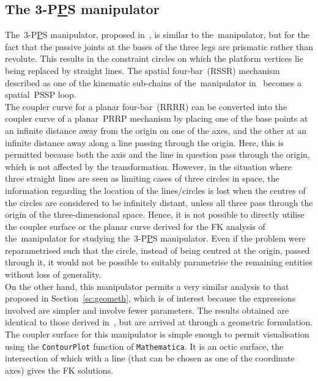\documentclass[DD]{iitmdiss}
\newcommand{\mref}[1]{\ref{#1}}
\newcommand{\mcite}[1]{\cite{#1}}
\newcommand{\mlabel}[1]{\label{#1}}
\begin{document}
\subsection{The 3-P\underline{P}S manipulator} \mlabel{sc:pps}
%
The~3-P\underline{P}S manipulator, proposed in~\mcite{ruggiu2009}, is similar to the~\rps manipulator, but for the fact that the passive joints at the bases of the three legs are prismatic rather than revolute. This results in the constraint circles on which the platform vertices lie being replaced by straight lines. The spatial four-bar~(RSSR) mechanism described as one of the kinematic sub-chains of the~\rps manipulator in~\mcite{tk2017a} becomes a spatial~PSSP loop.\\
The coupler curve for a planar four-bar~(RRRR) can be converted into the coupler curve of a planar~PRRP mechanism by placing one of the base points at an infinite distance away from the origin on one of the axes, and the other at an infinite distance away along a line passing through the origin. Here, this is permitted because both the axis and the line in question pass through the origin, which is not affected by the transformation. However, in the situation where three straight lines are seen as limiting cases of three circles in space, the information regarding the location of the lines/circles is lost when the centres of the circles are considered to be infinitely distant, unless all three pass through the origin of the three-dimensional space. Hence, it is not possible to directly utilise the coupler surface or the planar curve derived for the FK analysis of the~\rps manipulator for studying the~3-P\underline{P}S manipulator. Even if the problem were reparametrised such that the circle, instead of being centred at the origin, passed through it, it would not be possible to suitably parametrise the remaining entities without loss of generality.\\
On the other hand, this manipulator permits a very similar analysis to that proposed in Section~\mref{sc:geometh}, which is of interest because the expressions involved are simpler and involve fewer parameters. The results obtained are identical to those derived in~\mcite{ruggiu2009}, but are arrived at through a geometric formulation. The coupler surface for this manipulator is simple enough to permit visualisation using the \verb|ContourPlot| function of \verb|Mathematica|. It is an octic surface, the intersection of which with a line (that can be chosen as one of the coordinate axes) gives the FK solutions.\\
%
\end{document}
